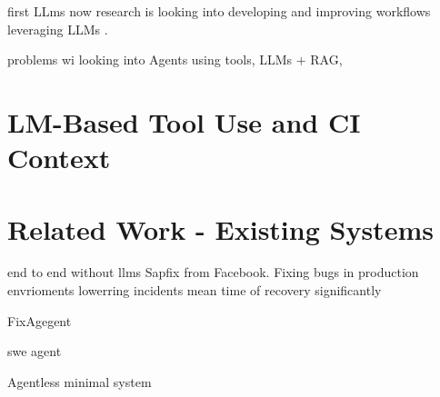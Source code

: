 first LLms now research is looking into developing and improving workflows leveraging LLMs \cite{puvvadiCodingAgentsComprehensive2025}.

problems wi
looking into Agents using tools, LLMs + RAG,

\section{LM-Based Tool Use and CI Context}


\section{Related Work - Existing Systems}


end to end without llms Sapfix from Facebook. Fixing bugs in production envrioments lowerring incidents mean time of recovery significantly \cite{margineanSapFixAutomatedEndtoEnd2019}

FixAgegent \cite{leeUnifiedDebuggingApproach2024}

swe agent \cite{yangSWEagentAgentComputerInterfaces2024}

Agentless minimal system \cite{xiaAgentlessDemystifyingLLMbased2024}